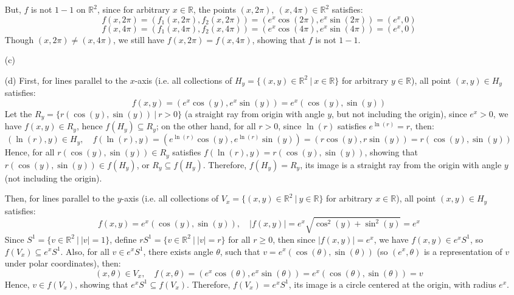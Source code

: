 \documentclass{article}
\begin{document}
\begin{itemize}
    But, $f$ is not $1-1$ on $\mathbb{R}^2$, since for arbitrary $x\in \mathbb{R}$, the points $(x,2\pi),\ (x,4\pi)\in\mathbb{R}^2$ satisfies:
    $$f(x,2\pi) = (f_1(x,2\pi),f_2(x,2\pi))=(e^x\cos(2\pi),e^x\sin(2\pi)) = (e^x,0)$$
    $$f(x,4\pi) = (f_1(x,4\pi),f_2(x,4\pi))=(e^x\cos(4\pi),e^x\sin(4\pi)) = (e^x,0)$$
    Though $(x,2\pi)\neq (x,4\pi)$, we still have $f(x,2\pi)=f(x,4\pi)$, showing that $f$ is not $1-1$.

    \hfil

    \item[(c)] 


    \hfil

    \item[(d)] First, for lines parallel to the $x$-axis (i.e. all collections of $H_y = \{(x,y)\in\mathbb{R}^2\ |\ x\in\mathbb{R}\}$ for arbitrary $y\in\mathbb{R}$), all point $(x,y)\in H_y$ satisfies:
    $$f(x,y) = (e^x\cos(y),e^x\sin(y)) = e^x(\cos(y),\sin(y))$$
    Let the $R_y = \{r(\cos(y),\sin(y))\ |\ r>0\}$ (a straight ray from origin with angle $y$, but not including the origin), since $e^x>0$, we have $f(x,y)\in R_y$, hence $f(H_y)\subseteq R_y$;
    on the other hand, for all $r>0$, since $\ln(r)$ satisfies $e^{\ln(r)}=r$, then:
    $$(\ln(r),y)\in H_y,\quad f(\ln(r),y) = (e^{\ln(r)}\cos(y),e^{\ln(r)}\sin(y)) = (r\cos(y),r\sin(y))=r(\cos(y),\sin(y))$$
    Hence, for all $r(\cos(y),\sin(y))\in R_y$ satisfies $f(\ln(r),y)=r(\cos(y),\sin(y))$, showing that $r(\cos(y),\sin(y))\in f(H_y)$, or $R_y\subseteq f(H_y)$.
    Therefore, $f(H_y)=R_y$, its image is a straight ray from the origin with angle $y$ (not including the origin).

    Then, for lines parallel to the $y$-axis (i.e. all collections of $V_x = \{(x,y)\in\mathbb{R}^2\ |\ y\in\mathbb{R}\}$ for arbitrary $x\in \mathbb{R}$), all point $(x,y)\in H_y$ satisfies:
    $$f(x,y)=e^x(\cos(y),\sin(y)),\quad |f(x,y)| = e^x\sqrt{\cos^2(y)+\sin^2(y)}=e^x$$
    Since $S^1 = \{v\in\mathbb{R}^2\ |\ |v|=1\}$, define $rS^1 = \{v\in\mathbb{R}^2\ |\ |v|=r\}$ for all $r\geq 0$, then since $|f(x,y)| = e^x$, we have $f(x,y)\in e^x S^1$, so $f(V_x)\subseteq e^xS^1$.
    Also, for all $v\in e^xS^1$, there exists angle $\theta$, such that $v = e^x(\cos(\theta),\sin(\theta))$ (so $(e^x,\theta)$ is a representation of $v$ under polar coordinates), then:
    $$(x,\theta)\in V_x,\quad f(x,\theta)=(e^x\cos(\theta),e^x\sin(\theta)) = e^x(\cos(\theta),\sin(\theta)) = v$$
    Hence, $v\in f(V_x)$, showing that $e^xS^1\subseteq f(V_x)$. Therefore, $f(V_x)=e^xS^1$, its image is a circle centered at the origin, with radius $e^x$.
\end{itemize}
\end{document}
